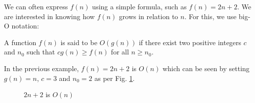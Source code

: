   We can often express \( f(n) \) using a simple formula, such as \( f(n) = 2n + 2 \).
  We are interested in knowing how \( f(n) \) grows in relation to \( n \).
  For this, we use big-O notation:
  \begin{definition}
    A function \( f(n) \) is said to be \( O(g(n)) \) if there exist two positive integers \( c \) and \( n_0 \) such that \( cg(n) \geq f(n) \) for all \(n \geq n_0 \).
  \end{definition}
  In the previous example, \( f(n) = 2n + 2 \) is \( O(n) \) which can be seen by setting \( g(n) = n \), \( c = 3 \) and \( n_0 = 2 \) as per Fig. \ref{plot:2n2}.
  \begin{figure}[H]
  \caption{\( 2n + 2 \) is \( O(n) \)}
  \label{plot:2n2}
\end{figure}
   
